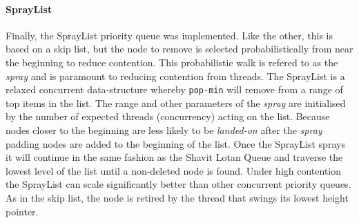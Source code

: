 \paragraph{SprayList} Finally, the SprayList priority queue was implemented. \cite{SprayList}  Like the other, this is based on a skip list, but the node to remove is selected probabilistically from near the beginning to reduce contention. This probabilistic walk is refered to as the \textit{spray} and is paramount to reducing contention from threads. The SprayList is a relaxed concurrent data-structure whereby \texttt{pop-min} will remove from a range of top items in the list. The range and other parameters of the \textit{spray} are initialised by the number of expected threads (concurrency) acting on the list. Because nodes closer to the beginning are less likely to be \textit{landed-on} after the \textit{spray} padding nodes are added to the beginning of the list. Once the SprayList sprays it will continue in the same fashion as the Shavit Lotan Queue and traverse the lowest level of the list until a non-deleted node is found. Under high contention the SprayList can scale significantly better than other concurrent priority queues. As in the skip list, the node is retired by the thread that swings its lowest height pointer. 